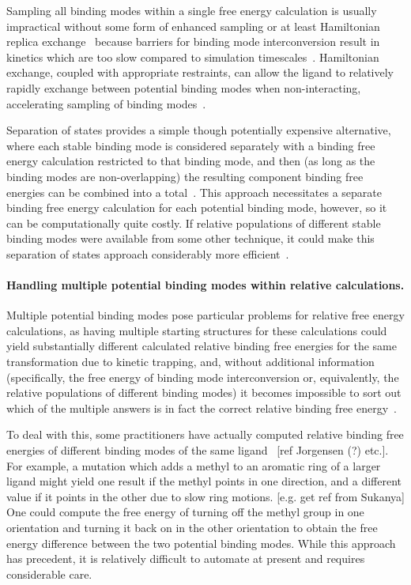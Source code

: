 \documentclass[9pt,bestpractices]{livecoms}
\begin{document}
Sampling all binding modes within a single free energy calculation is usually impractical without some form of enhanced sampling or at least Hamiltonian replica exchange~\cite{wang2013identifying} because barriers for binding mode interconversion result in kinetics which are too slow compared to simulation timescales~\cite{mobley2006use, palma2012computation,mobley2012perspective, gill2018binding}.
Hamiltonian exchange, coupled with appropriate restraints, can allow the ligand to relatively rapidly exchange between potential binding modes when non-interacting, accelerating sampling of binding modes~\cite{wang2013identifying}.

Separation of states provides a simple though potentially expensive alternative, where each stable binding mode is considered separately with a binding free energy calculation restricted to that binding mode, and then (as long as the binding modes are non-overlapping) the resulting component binding free energies can be combined into a total~\cite{mobley2006use, mobley2012perspective}.
This approach necessitates a separate binding free energy calculation for each potential binding mode, however, so it can be computationally quite costly.
If relative populations of different stable binding modes were available from some other technique, it could make this separation of states approach considerably more efficient~\cite{mobley2012perspective, gill2018binding}.

\paragraph{Handling multiple potential binding modes within relative calculations.}

Multiple potential binding modes pose particular problems for relative free energy calculations, as having multiple starting structures for these calculations could yield substantially different calculated relative binding free energies for the same transformation due to kinetic trapping, and, without additional information (specifically, the free energy of binding mode interconversion or, equivalently, the relative populations of different binding modes) it becomes impossible to sort out which of the multiple answers is in fact the correct relative binding free energy~\cite{}.

To deal with this, some practitioners have actually computed relative binding free energies of different binding modes of the same ligand~\cite{palma2012computation} [ref Jorgensen (?) etc.].
For example, a mutation which adds a methyl to an aromatic ring of a larger ligand might yield one result if the methyl points in one direction, and a different value if it points in the other due to slow ring motions. [e.g. get ref from Sukanya]
One could compute the free energy of turning off the methyl group in one orientation and turning it back on in the other orientation to obtain the free energy difference between the two potential binding modes.
While this approach has precedent, it is relatively difficult to automate at present and requires considerable care.
\end{document}
